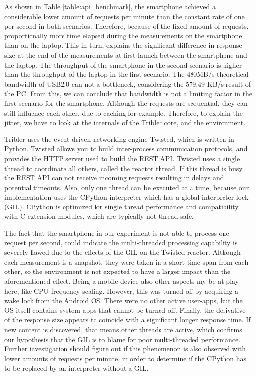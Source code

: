 As shown in Table \ref{table:api_benchmark}, the smartphone achieved a considerable lower amount of requests per minute than the constant rate of one per second in both scenarios.
Therefore, because of the fixed amount of requests, proportionally more time elapsed during the measurements on the smartphone than on the laptop.
This in turn, explains the significant difference in response size at the end of the measurements at first launch between the smartphone and the laptop.
The throughput of the smartphone in the second scenario is higher than the throughput of the laptop in the first scenario.
The 480MB/s theoretical bandwidth of USB2.0 can not a bottleneck, considering the 579.49 KB/s result of the PC.
From this, we can conclude that bandwidth is not a limiting factor in the first scenario for the smartphone.
Although the requests are sequential, they can still influence each other, due to caching for example.
Therefore, to explain the jitter, we have to look at the internals of the Tribler core, and the environment.

Tribler uses the event-driven networking engine Twisted, which is written in Python.
Twisted allows you to build inter-process communication protocols, and provides the HTTP server used to build the REST API.
Twisted uses a single thread to coordinate all others, called the reactor thread.
If this thread is busy, the REST API can not receive incoming requests resulting in delays and potential timeouts.
Also, only one thread can be executed at a time, because our implementation uses the CPython interpreter which has a global interpreter lock (GIL).
CPython is optimized for single thread performance and compatibility with C extension modules, which are typically not thread-safe.

The fact that the smartphone in our experiment is not able to process one request per second, could indicate the multi-threaded processing capability is severely flawed due to the effects of the GIL on the Twisted reactor.
Although each measurement is a snapshot, they were taken in a short time span from each other, so the environment is not expected to have a larger impact than the aforementioned effect.
Being a mobile device also other aspects my be at play here, like CPU frequency scaling.
However, this was turned off by acquiring a wake lock from the Android OS.
There were no other active user-apps, but the OS itself contains system-apps that cannot be turned off.
Finally, the derivative of the response size appears to coincide with a significant longer response time.
If new content is discovered, that means other threads are active, which confirms our hypothesis that the GIL is to blame for poor multi-threaded performance.
Further investigation should figure out if this phenomenon is also observed with lower amounts of requests per minute, in order to determine if the CPython has to be replaced by an interpreter without a GIL.


